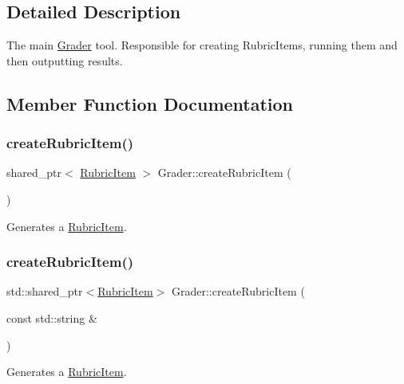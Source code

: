 \subsection{Detailed Description}
The main \hyperlink{class_grader}{Grader} tool. Responsible for creating Rubric\+Items, running them and then outputting results. 

\subsection{Member Function Documentation}
\hypertarget{class_grader_a1fe6c647f25dcbe5559cd04832521358}{}\label{class_grader_a1fe6c647f25dcbe5559cd04832521358} 
\subsubsection{\texorpdfstring{create\+Rubric\+Item()}{createRubricItem()}\hspace{0.1cm}{\footnotesize\ttfamily [1/3]}}
{\footnotesize\ttfamily shared\+\_\+ptr$<$ \hyperlink{class_rubric_item}{Rubric\+Item} $>$ Grader\+::create\+Rubric\+Item (\begin{DoxyParamCaption}{ }\end{DoxyParamCaption})}

Generates a \hyperlink{class_rubric_item}{Rubric\+Item}. \hypertarget{class_grader_a7867718932be3b027457c839d29b52b9}{}\label{class_grader_a7867718932be3b027457c839d29b52b9} 
\subsubsection{\texorpdfstring{create\+Rubric\+Item()}{createRubricItem()}\hspace{0.1cm}{\footnotesize\ttfamily [2/3]}}
{\footnotesize\ttfamily std\+::shared\+\_\+ptr$<$\hyperlink{class_rubric_item}{Rubric\+Item}$>$ Grader\+::create\+Rubric\+Item (\begin{DoxyParamCaption}\item[{const std\+::string \&}]{ }\end{DoxyParamCaption})}

Generates a \hyperlink{class_rubric_item}{Rubric\+Item}. \hypertarget{class_grader_af367b7f22b6df92f3fd9575fad107d50}{}\label{class_grader_af367b7f22b6df92f3fd9575fad107d50} 

